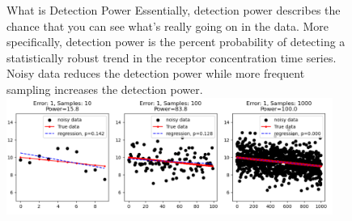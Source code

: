 \begin{figure}
    \begin{breakawaybox}[label={box:dp}]{What is Detection Power}
        Essentially, detection power describes the chance that you can see what's really going on in the data.
        More specifically, detection power is the percent probability of detecting a statistically robust trend in the receptor concentration time series.
        Noisy data reduces the detection power while more frequent sampling increases the detection power.
        \\
        \includegraphics[width=0.95\textwidth]{figures/dp_ex}
    \end{breakawaybox}
\end{figure}

